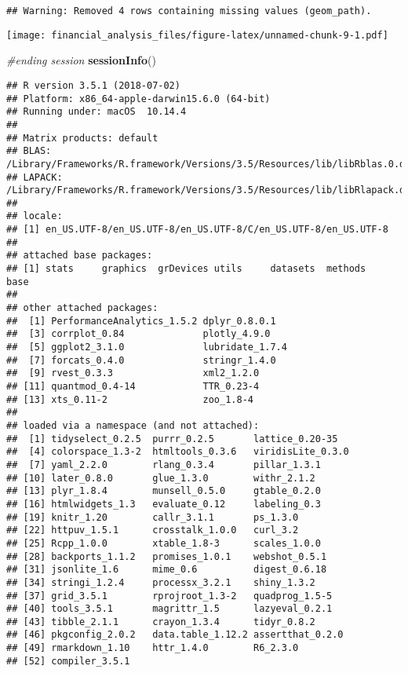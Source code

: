 \documentclass[]{article}
\newenvironment{Shaded}{\begin{snugshade}}{\end{snugshade}}
\newcommand{\KeywordTok}[1]{\textcolor[rgb]{0.13,0.29,0.53}{\textbf{#1}}}
\newcommand{\CommentTok}[1]{\textcolor[rgb]{0.56,0.35,0.01}{\textit{#1}}}
\newcommand{\NormalTok}[1]{#1}
\begin{document}
\begin{verbatim}
## Warning: Removed 4 rows containing missing values (geom_path).
\end{verbatim}

\texttt{[image: financial\_analysis\_files/figure-latex/unnamed-chunk-9-1.pdf]}

\begin{Shaded}
\begin{Highlighting}[]
\CommentTok{#ending session}
\KeywordTok{sessionInfo}\NormalTok{()}
\end{Highlighting}
\end{Shaded}

\begin{verbatim}
## R version 3.5.1 (2018-07-02)
## Platform: x86_64-apple-darwin15.6.0 (64-bit)
## Running under: macOS  10.14.4
## 
## Matrix products: default
## BLAS: /Library/Frameworks/R.framework/Versions/3.5/Resources/lib/libRblas.0.dylib
## LAPACK: /Library/Frameworks/R.framework/Versions/3.5/Resources/lib/libRlapack.dylib
## 
## locale:
## [1] en_US.UTF-8/en_US.UTF-8/en_US.UTF-8/C/en_US.UTF-8/en_US.UTF-8
## 
## attached base packages:
## [1] stats     graphics  grDevices utils     datasets  methods   base     
## 
## other attached packages:
##  [1] PerformanceAnalytics_1.5.2 dplyr_0.8.0.1             
##  [3] corrplot_0.84              plotly_4.9.0              
##  [5] ggplot2_3.1.0              lubridate_1.7.4           
##  [7] forcats_0.4.0              stringr_1.4.0             
##  [9] rvest_0.3.3                xml2_1.2.0                
## [11] quantmod_0.4-14            TTR_0.23-4                
## [13] xts_0.11-2                 zoo_1.8-4                 
## 
## loaded via a namespace (and not attached):
##  [1] tidyselect_0.2.5  purrr_0.2.5       lattice_0.20-35  
##  [4] colorspace_1.3-2  htmltools_0.3.6   viridisLite_0.3.0
##  [7] yaml_2.2.0        rlang_0.3.4       pillar_1.3.1     
## [10] later_0.8.0       glue_1.3.0        withr_2.1.2      
## [13] plyr_1.8.4        munsell_0.5.0     gtable_0.2.0     
## [16] htmlwidgets_1.3   evaluate_0.12     labeling_0.3     
## [19] knitr_1.20        callr_3.1.1       ps_1.3.0         
## [22] httpuv_1.5.1      crosstalk_1.0.0   curl_3.2         
## [25] Rcpp_1.0.0        xtable_1.8-3      scales_1.0.0     
## [28] backports_1.1.2   promises_1.0.1    webshot_0.5.1    
## [31] jsonlite_1.6      mime_0.6          digest_0.6.18    
## [34] stringi_1.2.4     processx_3.2.1    shiny_1.3.2      
## [37] grid_3.5.1        rprojroot_1.3-2   quadprog_1.5-5   
## [40] tools_3.5.1       magrittr_1.5      lazyeval_0.2.1   
## [43] tibble_2.1.1      crayon_1.3.4      tidyr_0.8.2      
## [46] pkgconfig_2.0.2   data.table_1.12.2 assertthat_0.2.0 
## [49] rmarkdown_1.10    httr_1.4.0        R6_2.3.0         
## [52] compiler_3.5.1
\end{verbatim}
\end{document}
